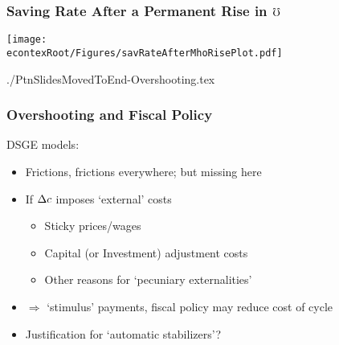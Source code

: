 \documentclass[pdflatex]{beamer}
\begin{document}
                                             \begin{frame}\frametitle{\textbf{Saving Rate After a Permanent Rise in $\mho$}}

                                               \texttt{[image: \\econtexRoot/Figures/savRateAfterMhoRisePlot.pdf]}

                                             \end{frame}

                                             \begin{verbatimwrite}{./PtnSlidesMovedToEnd-Overshooting.tex}
                                               \begin{frame}\frametitle{\bf Overshooting and Fiscal Policy}

                                                 DSGE models:
                                                 \begin{itemize}
                                                 \item Frictions, frictions everywhere; but missing here
                                                 \item If $\Delta c$ imposes `external' costs
                                                   \begin{itemize}
                                                   \item Sticky prices/wages
                                                   \item Capital (or Investment) adjustment costs
                                                   \item Other reasons for `pecuniary externalities'
                                                   \end{itemize}
                                                 \item $\Rightarrow$ `stimulus' payments, fiscal policy may reduce cost of cycle
                                                 \item Justification for `automatic stabilizers'?
                                                 \end{itemize}

                                               \end{frame}
                                             \end{verbatimwrite}
\end{document}
